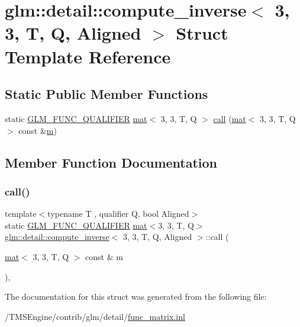 \hypertarget{structglm_1_1detail_1_1compute__inverse_3_013_00_013_00_01_t_00_01_q_00_01_aligned_01_4}{}\section{glm\+:\+:detail\+:\+:compute\+\_\+inverse$<$ 3, 3, T, Q, Aligned $>$ Struct Template Reference}
\label{structglm_1_1detail_1_1compute__inverse_3_013_00_013_00_01_t_00_01_q_00_01_aligned_01_4}
\subsection*{Static Public Member Functions}
\begin{DoxyCompactItemize}
\item 
static \hyperlink{setup_8hpp_a33fdea6f91c5f834105f7415e2a64407}{G\+L\+M\+\_\+\+F\+U\+N\+C\+\_\+\+Q\+U\+A\+L\+I\+F\+I\+ER} \hyperlink{structglm_1_1mat}{mat}$<$ 3, 3, T, Q $>$ \hyperlink{structglm_1_1detail_1_1compute__inverse_3_013_00_013_00_01_t_00_01_q_00_01_aligned_01_4_a55c36db03fba738434c3f47b6a794ae7}{call} (\hyperlink{structglm_1_1mat}{mat}$<$ 3, 3, T, Q $>$ const \&\hyperlink{_s_d_l__opengl__glext_8h_af593500c283bf1a787a6f947f503a5c2}{m})
\end{DoxyCompactItemize}


\subsection{Member Function Documentation}
\mbox{\label{structglm_1_1detail_1_1compute__inverse_3_013_00_013_00_01_t_00_01_q_00_01_aligned_01_4_a55c36db03fba738434c3f47b6a794ae7}} 
\subsubsection{\texorpdfstring{call()}{call()}}
{\footnotesize\ttfamily template$<$typename T , qualifier Q, bool Aligned$>$ \\
static \hyperlink{setup_8hpp_a33fdea6f91c5f834105f7415e2a64407}{G\+L\+M\+\_\+\+F\+U\+N\+C\+\_\+\+Q\+U\+A\+L\+I\+F\+I\+ER} \hyperlink{structglm_1_1mat}{mat}$<$3, 3, T, Q$>$ \hyperlink{structglm_1_1detail_1_1compute__inverse}{glm\+::detail\+::compute\+\_\+inverse}$<$ 3, 3, T, Q, Aligned $>$\+::call (\begin{DoxyParamCaption}\item[{\hyperlink{structglm_1_1mat}{mat}$<$ 3, 3, T, Q $>$ const \&}]{m }\end{DoxyParamCaption})\hspace{0.3cm}{\ttfamily [inline]}, {\ttfamily [static]}}



The documentation for this struct was generated from the following file\+:\begin{DoxyCompactItemize}
\item 
/\+T\+M\+S\+Engine/contrib/glm/detail/\hyperlink{func__matrix_8inl}{func\+\_\+matrix.\+inl}\end{DoxyCompactItemize}

